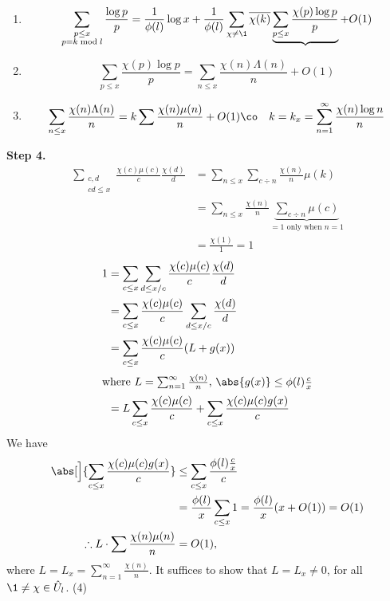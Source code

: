 \begin{enumerate}
\item 
\[ \sum_{\substack{p\leq x\\p=k \bmod l}}\frac{\log p}{p} = \frac{1}{\phi(l)}\log x + \frac{1}{\phi(l)}\sum_{\chi\neq\1}\overline{\chi(k)}\underbrace{\sum_{p\leq x}\frac{\chi(p)\log p}{p}} + O(1) \]
\item
\[ \sum_{p\leq x}\frac{\chi(p)\log p}{p} = \sum_{n\leq x}\frac{\chi(n)\Lambda(n)}{n} + O(1) \]
\item
\[ \sum_{n\leq x}\frac{\chi(n)\Lambda(n)}{n} = k\sum\frac{\chi(n)\mu(n)}{n} + O(1)\co\quad k=k_x=\sum_{n=1}^\infty\frac{\chi(n)\log n}{n} \]
\end{enumerate}
\textbf{Step 4.}
\begin{align*}
\sum_{\substack{c,d\\cd\leq x}}\frac{\chi(c)\mu(c)}{c}\frac{\chi(d)}{d}
&= \sum_{n\leq x}\sum_{c\div n}\frac{\chi(n)}{n} \mu(k) \\
&= \sum_{n\leq x}\frac{\chi(n)}{n}\underbrace{\sum_{c\div n}\mu(c)}_{\text{$=1$ only when $n=1$}} \\
&= \frac{\chi(1)}{1} = 1
\end{align*}
\begin{align*}
1 &= \sum_{c\leq x}\sum_{d\leq x/c}\frac{\chi(c)\mu(c)}{c}\frac{\chi(d)}{d} \\
&= \sum_{c\leq x}\frac{\chi(c)\mu(c)}{c}\sum_{d\leq x/c}\frac{\chi(d)}{d} \\
&= \sum_{c\leq x}\frac{\chi(c)\mu(c)}{c}(L+g(x)) \\ \intertext{where $L=\sum_{n=1}^\infty\frac{\chi(n)}{n}$, $\abs{g(x)}\leq\phi(l)\frac cx$}
&= L\sum_{c\leq x}\frac{\chi(c)\mu(c)}{c} + \sum_{c\leq x}\frac{\chi(c)\mu(c)g(x)}{c}
\end{align*}
We have
\begin{align*}
\abs[\Big]{\sum_{c\leq x}\frac{\chi(c)\mu(c)g(x)}{c}} &\leq \sum_{c\leq x}\frac{\phi(l)\frac cx}{c} \\
&= \frac{\phi(l)}{x} \sum_{c\leq x} 1 = \frac{\phi(l)}{x} (x+O(1)) = O(1) \\
\therefore L\cdot\sum\frac{\chi(n)\mu(n)}{n} &= O(1),
\end{align*}
where $L=L_x=\sum_{n=1}^\infty\frac{\chi(n)}{n}$.  It suffices to show that $L=L_x\neq0$, for all $\1\neq\chi\in\hat U_l$. (4)

